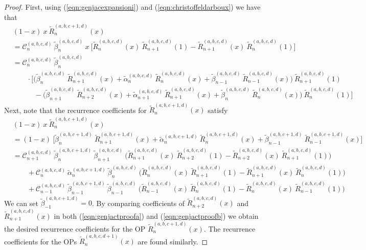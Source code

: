 \documentclass[11pt, oneside]{article}   	%
\newcommand{\genjac}{R}
\newcommand{\genjact}{\tilde{\genjac}}
\begin{document}
\begin{proof}
First, using (\ref{eqn:genjacexpansioni}) and (\ref{eqn:christoffeldarboux}) we have that
\begin{align}
	&(1-x) \: x \: \genjact_{n}^{(a,b,c+1,d)}(x) \nonumber \\
	&= \mathcal{C}_n^{(a,b,c,d)} \: \tilde{\beta}_{n}^{(a,b,c,d)} \: x \: \Big[\genjact_{n}^{(a,b,c,d)}(x) \: \genjact_{n+1}^{(a,b,c,d)}(1) - \genjact_{n+1}^{(a,b,c,d)}(x) \: \genjact_{n}^{(a,b,c,d)}(1)\Big] \nonumber \\
	&= \mathcal{C}_n^{(a,b,c,d)} \: \tilde{\beta}_{n}^{(a,b,c,d)} \nonumber \\
	& \quad \quad \cdot \Big[\Big(\tilde{\beta}_{n}^{(a,b,c,d)} \: \genjact_{n+1}^{(a,b,c,d)}(x) + \tilde{\alpha}_{n}^{(a,b,c,d)} \: \genjact_{n}^{(a,b,c,d)}(x) + \tilde{\beta}_{n-1}^{(a,b,c,d)} \: \genjact_{n-1}^{(a,b,c,d)}(x)\Big) \: \genjact_{n+1}^{(a,b,c,d)}(1) \nonumber \\
	& \quad \quad \quad - \Big(\tilde{\beta}_{n+1}^{(a,b,c,d)} \: \genjact_{n+2}^{(a,b,c,d)}(x) + \tilde{\alpha}_{n+1}^{(a,b,c,d)} \: \genjact_{n+1}^{(a,b,c,d)}(x) + \tilde{\beta}_{n}^{(a,b,c,d)} \: \genjact_{n}^{(a,b,c,d)}(x)\Big) \: \genjact_{n}^{(a,b,c,d)}(1) \Big] \label{eqn:genjactproofa}
\end{align}
Next, note that the recurrence coefficients for $\genjact_{n}^{(a,b,c+1,d)}(x)$ satisfy
\begin{align}
	&(1-x) \: x \: \genjact_{n}^{(a,b,c+1,d)}(x) \nonumber \\
	&= (1-x) \: \Big[\tilde{\beta}_{n}^{(a,b,c+1,d)} \: \genjact_{n+1}^{(a,b,c+1,d)}(x) + \tilde{\alpha}_{n}^{(a,b,c+1,d)} \: \genjact_{n}^{(a,b,c+1,d)}(x) + \tilde{\beta}_{n-1}^{(a,b,c+1,d)} \: \genjact_{n-1}^{(a,b,c+1,d)}(x)\Big] \nonumber \\
	&= \mathcal{C}_{n+1}^{(a,b,c,d)} \: \tilde{\beta}_{n}^{(a,b,c+1,d)} \: \tilde{\beta}_{n+1}^{(a,b,c,d)} \: \Big( \genjact_{n+1}^{(a,b,c,d)}(x) \: \genjact_{n+2}^{(a,b,c,d)}(1) - \genjact_{n+2}^{(a,b,c,d)}(x) \: \genjact_{n+1}^{(a,b,c,d)}(1) \Big) \nonumber \\
	& \quad \quad + \mathcal{C}_n^{(a,b,c,d)} \: \tilde{\alpha}_{n}^{(a,b,c+1,d)} \: \tilde{\beta}_{n}^{(a,b,c,d)} \: \Big( \genjact_{n}^{(a,b,c,d)}(x) \: \genjact_{n+1}^{(a,b,c,d)}(1) - \genjact_{n+1}^{(a,b,c,d)}(x) \: \genjact_{n}^{(a,b,c,d)}(1) \Big) \nonumber \\
	& \quad \quad + \mathcal{C}_{n-1}^{(a,b,c,d)} \: \tilde{\beta}_{n-1}^{(a,b,c+1,d)} \: \tilde{\beta}_{n-1}^{(a,b,c,d)} \: \Big( \genjact_{n-1}^{(a,b,c,d)}(x) \: \genjact_{n}^{(a,b,c,d)}(1) - \genjact_{n}^{(a,b,c,d)}(x) \: \genjact_{n-1}^{(a,b,c,d)}(1) \Big) \label{eqn:genjactproofb}
\end{align}
We can set $\tilde{\beta}_{-1}^{(a,b,c+1,d)} = 0$. By comparing coefficients of $\genjact_{n+2}^{(a,b,c,d)}(x)$ and $\genjact_{n+1}^{(a,b,c,d)}(x)$ in both (\ref{eqn:genjactproofa}) and (\ref{eqn:genjactproofb}) we obtain the desired recurrence coefficients for the OP $\genjact_{n}^{(a,b,c+1,d)}(x)$. The recurrence coefficients for the OPs $\genjact_{n}^{(a,b,c,d+1)}(x)$ are found similarly.
\end{proof}
\end{document}
